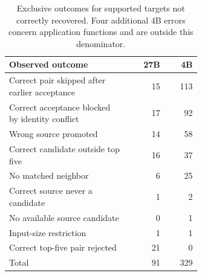 \begin{table}[htbp]
\caption{Exclusive outcomes for supported targets not correctly recovered. Four additional 4B errors concern application functions and are outside this denominator.}
\label{tab:exp5-barriers}
\centering\small
\begin{tabular}{p{0.63\linewidth}rr}
\toprule
Observed outcome & 27B & 4B\\
\midrule
Correct pair skipped after earlier acceptance & 15 & 113\\
Correct acceptance blocked by identity conflict & 17 & 92\\
Wrong source promoted & 14 & 58\\
Correct candidate outside top five & 16 & 37\\
No matched neighbor & 6 & 25\\
Correct source never a candidate & 1 & 2\\
No available source candidate & 0 & 1\\
Input-size restriction & 1 & 1\\
Correct top-five pair rejected & 21 & 0\\
Total & 91 & 329\\
\bottomrule
\end{tabular}
\end{table}
